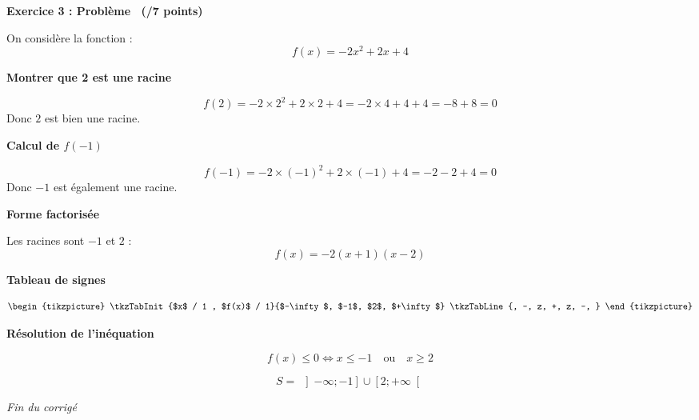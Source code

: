 \documentclass[12pt,a4paper]{exam}
\begin{document}
\vspace{0.5cm}

\noindent
\textbf{Exercice 3 : Problème \ (/7 points)}

\vspace{0.3cm}
On considère la fonction :
\[
f(x) = -2x^2 + 2x + 4
\]

\begin{questions}

\question \textbf{Montrer que 2 est une racine}

\[
f(2) = -2 \times 2^2 + 2 \times 2 + 4 = -2 \times 4 + 4 + 4 = -8 + 8 = 0
\]
Donc $2$ est bien une racine.

\question \textbf{Calcul de $f(-1)$}

\[
f(-1) = -2 \times (-1)^2 + 2 \times (-1) + 4 = - 2 - 2 + 4 = 0
\]
Donc $-1$ est également une racine.

\question \textbf{Forme factorisée}

Les racines sont $-1$ et $2$ :
\[
\boxed{f(x) = -2(x+1)(x-2)}
\]

\question \textbf{Tableau de signes}

\[
\begin{tikzpicture}
   \tkzTabInit{$x$ / 1 , $f(x)$ / 1}{$-\infty$, $-1$, $2$, $+\infty$}
   \tkzTabLine{, -, z, +, z, -, }
\end{tikzpicture}
\]

\question \textbf{Résolution de l’inéquation}

\[
f(x) \leq 0 \iff x \leq -1 \quad \text{ou} \quad x \geq 2
\]

\[
\boxed{S = \ \left]-\infty;-1\right] \cup \left[2;+\infty\right[}
\]

\end{questions}

\vspace{0.5cm}

\begin{center}
    \textit{Fin du corrigé}
\end{center}
\end{document}
